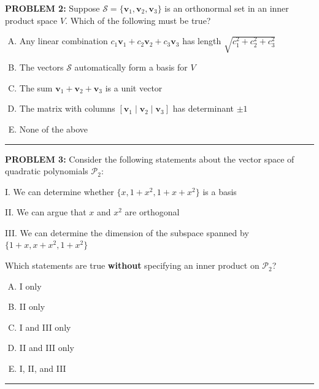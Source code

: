 \documentclass[12pt]{amsart}
\newcommand{\divider}{
  \vspace{-1em} %
  \noindent
  \raisebox{-0.15ex}{\textbullet}%
  \hspace{0.5em}%
  \rule[0.5ex]{0.95\textwidth}{1.0pt}%
  \hspace{0.5em}%
  \raisebox{-0.15ex}{\textbullet}%
  \vspace{0em} %
}
\begin{document}
{\bf PROBLEM 2:}
Suppose ${\mathcal S} = \{\mathbf{v}_1, \mathbf{v}_2, \mathbf{v}_3\}$ is an orthonormal set in an inner product space $V$. Which of the following must be true?
%
\begin{enumerate}[(A)]
\item Any linear combination $c_1\mathbf{v}_1 + c_2\mathbf{v}_2 + c_3\mathbf{v}_3$ has length $\sqrt{c_1^2 + c_2^2 + c_3^2}$
\item The vectors ${\mathcal S}$ automatically form a basis for $V$
\item The sum $\mathbf{v}_1 + \mathbf{v}_2 + \mathbf{v}_3$ is a unit vector
\item The matrix with columns $[\mathbf{v}_1 \mid \mathbf{v}_2 \mid \mathbf{v}_3]$ has determinant $\pm 1$
\item None of the above
\end{enumerate}
%
\divider


{\bf PROBLEM 3:}
Consider the following statements about the vector space of quadratic polynomials $\mathcal{P}_2$:

I. We can determine whether $\{x, 1+x^2, 1+x+x^2\}$ is a basis 

II. We can argue that $x$ and $x^2$ are orthogonal

III. We can determine the dimension of the subspace spanned by $\{1+x, x+x^2, 1+x^2\}$

Which statements are true {\bf without} specifying an inner product on $\mathcal{P}_2$?
%
\begin{enumerate}[(A)]
\item I only
\item II only
\item I and III only
\item II and III only
\item I, II, and III
\end{enumerate}
%
\divider
\end{document}
